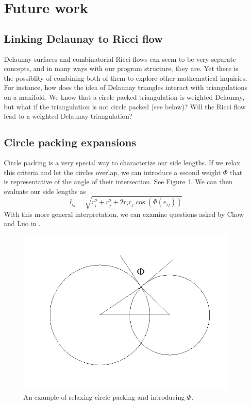 \documentclass[12pt]{article}
\begin{document}
\section{Future work}
\label{Future}

\subsection{Linking Delaunay to Ricci flow}
Delaunay surfaces and combinatorial Ricci flows can seem to be very separate concepts, and in many ways with our program structure, they are. Yet there is the possiblity of combining both of them to explore other mathematical inquiries. For instance, how does the idea of Delaunay triangles interact with triangulations on a manifold. We know that a circle packed triangulation is weighted Delaunay, but what if the triangulation is not circle packed (see below)? Will the Ricci flow lead to a weighted Delaunay triangulation?

\subsection{Circle packing expansions}
\label{circExt}
Circle packing is a very special way to characterize our side lengths. If we relax this criteria and let the circles overlap, we can introduce a second weight $\Phi$ that is representative of the angle of their intersection. See Figure \ref{fig:intcirc}. We can then evaluate our side lengths as $$l_{ij} = \sqrt{r_i^2 + r_j^2 + 2r_ir_j\cos(\Phi(e_{ij}))}$$ With this more general interpretation, we can examine questions asked by Chow and Luo in \cite{chowluo}.

\begin{figure}
\begin{center}
\includegraphics[scale = 0.6]{Pictures/intcirc2.png}
\end{center}
\caption{An example of relaxing circle packing and introducing $\Phi.$}
\label{fig:intcirc}
\end{figure}
\end{document}

